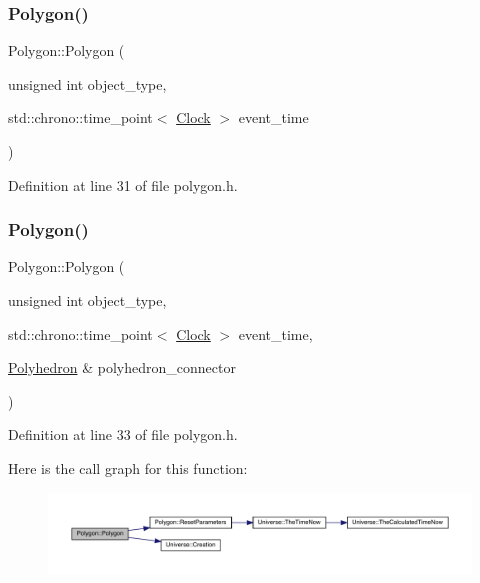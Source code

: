 \subsubsection{\texorpdfstring{Polygon()}{Polygon()}\hspace{0.1cm}{\footnotesize\ttfamily [3/4]}}
{\footnotesize\ttfamily Polygon\+::\+Polygon (\begin{DoxyParamCaption}\item[{unsigned int}]{object\+\_\+type,  }\item[{std\+::chrono\+::time\+\_\+point$<$ \mbox{\hyperlink{universe_8h_a0ef8d951d1ca5ab3cfaf7ab4c7a6fd80}{Clock}} $>$}]{event\+\_\+time }\end{DoxyParamCaption})\hspace{0.3cm}{\ttfamily [inline]}}



Definition at line 31 of file polygon.\+h.

\mbox{\label{class_polygon_a581ad88f80bf40668e6c8b928c908bcb}} 
\subsubsection{\texorpdfstring{Polygon()}{Polygon()}\hspace{0.1cm}{\footnotesize\ttfamily [4/4]}}
{\footnotesize\ttfamily Polygon\+::\+Polygon (\begin{DoxyParamCaption}\item[{unsigned int}]{object\+\_\+type,  }\item[{std\+::chrono\+::time\+\_\+point$<$ \mbox{\hyperlink{universe_8h_a0ef8d951d1ca5ab3cfaf7ab4c7a6fd80}{Clock}} $>$}]{event\+\_\+time,  }\item[{\mbox{\hyperlink{class_polyhedron}{Polyhedron}} \&}]{polyhedron\+\_\+connector }\end{DoxyParamCaption})\hspace{0.3cm}{\ttfamily [inline]}}



Definition at line 33 of file polygon.\+h.

Here is the call graph for this function\+:\nopagebreak
\begin{figure}[H]
\begin{center}
\leavevmode
\includegraphics[width=350pt]{class_polygon_a581ad88f80bf40668e6c8b928c908bcb_cgraph}
\end{center}
\end{figure}
\mbox{\label{class_polygon_a873f9acee059f717277b6414102dab16}} 
